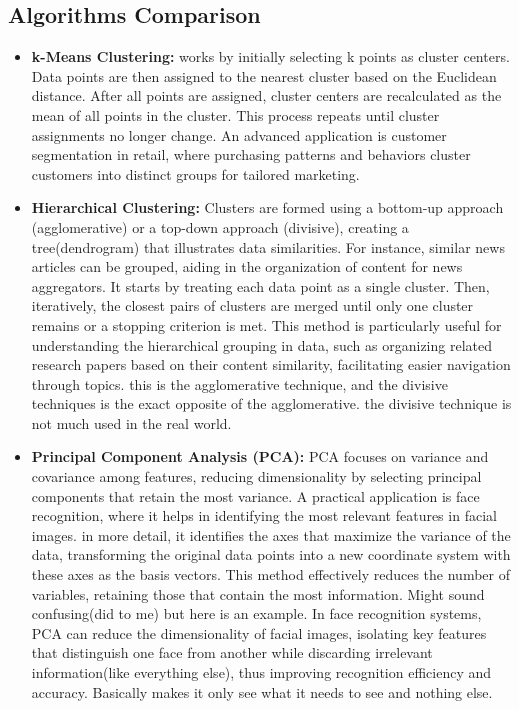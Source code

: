\documentclass[11pt, a4paper]{article}
\begin{document}
\subsection{Algorithms Comparison}
\begin{itemize}
    \item \textbf{k-Means Clustering:} works by initially selecting k points as cluster centers. Data points are then assigned to the nearest cluster based on the Euclidean distance. After all points are assigned, cluster centers are recalculated as the mean of all points in the cluster. This process repeats until cluster assignments no longer change. An advanced application is customer segmentation in retail, where purchasing patterns and behaviors cluster customers into distinct groups for tailored marketing.


\item \textbf{Hierarchical Clustering:} Clusters are formed using a bottom-up approach (agglomerative) or a top-down approach (divisive), creating a tree(dendrogram) that illustrates data similarities. For instance, similar news articles can be grouped, aiding in the organization of content for news aggregators. It starts by treating each data point as a single cluster. Then, iteratively, the closest pairs of clusters are merged until only one cluster remains or a stopping criterion is met. This method is particularly useful for understanding the hierarchical grouping in data, such as organizing related research papers based on their content similarity, facilitating easier navigation through topics. this is the agglomerative technique, and the divisive techniques is the exact opposite of the agglomerative. the divisive technique is not much used in the real world.

\item \textbf{Principal Component Analysis (PCA):} PCA focuses on variance and covariance among features, reducing dimensionality by selecting principal components that retain the most variance. A practical application is face recognition, where it helps in identifying the most relevant features in facial images. in more detail, it identifies the axes that maximize the variance of the data, transforming the original data points into a new coordinate system with these axes as the basis vectors. This method effectively reduces the number of variables, retaining those that contain the most information. Might sound confusing(did to me) but here is an example. In face recognition systems, PCA can reduce the dimensionality of facial images, isolating key features that distinguish one face from another while discarding irrelevant information(like everything else), thus improving recognition efficiency and accuracy.
Basically makes it only see what it needs to see and nothing else.
\end{itemize}
\end{document}
